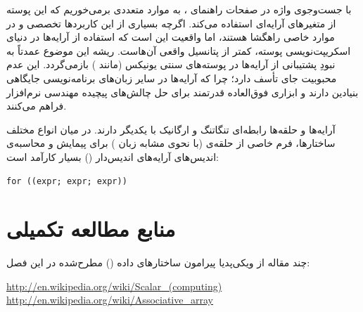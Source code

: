 با جست‌وجوی واژه  در صفحات راهنمای ، به موارد متعددی برمی‌خوریم که این پوسته از متغیرهای آرایه‌ای استفاده می‌کند. اگرچه بسیاری از این کاربردها تخصصی و در موارد خاصی راهگشا هستند، اما واقعیت این است که استفاده از آرایه‌ها در دنیای اسکریپت‌نویسی پوسته، کمتر از پتانسیل واقعی آن‌هاست. ریشه این موضوع عمدتاً به نبودِ پشتیبانی از آرایه‌ها در پوسته‌های سنتی یونیکس (مانند ) بازمی‌گردد. این عدم محبوبیت جای تأسف دارد؛ چرا که آرایه‌ها در سایر زبان‌های برنامه‌نویسی جایگاهی بنیادین دارند و ابزاری فوق‌العاده قدرتمند برای حل چالش‌های پیچیده مهندسی نرم‌افزار فراهم می‌کنند.

آرایه‌ها و حلقه‌ها رابطه‌ای تنگاتنگ و ارگانیک با یکدیگر دارند. در میان انواع مختلف ساختارها، فرم خاصی از حلقه‌ی  (با نحوی مشابه زبان ) برای پیمایش و محاسبه‌ی اندیس‌های آرایه‌های اندیس‌دار () بسیار کارآمد است:

\begin{latin}
\begin{lstlisting}
for ((expr; expr; expr))
\end{lstlisting}
\end{latin}

\section{منابع مطالعه تکمیلی}

چند مقاله از ویکی‌پدیا پیرامون ساختارهای داده () مطرح‌شده در این فصل:

\begin{latin}
\url{http://en.wikipedia.org/wiki/Scalar_(computing)}\\
\url{http://en.wikipedia.org/wiki/Associative_array}
\end{latin}